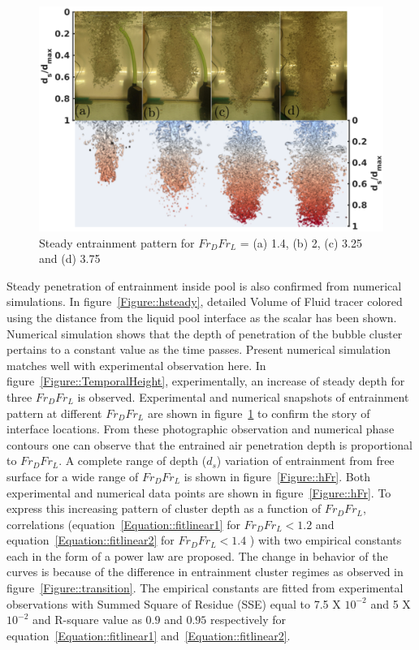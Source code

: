 \begin{figure}
	\centering
	\includegraphics[width=\linewidth]{chapters/jetPool/Figure14}
	\caption{Steady entrainment pattern for  $Fr_DFr_L$ = (a) 1.4, (b) 2, (c) 3.25 and (d) 3.75}
	\label{Figure::height_diff}		
\end{figure} 
Steady penetration of entrainment inside pool is also confirmed from numerical simulations. In figure~\ref{Figure::hsteady}, detailed Volume of Fluid tracer colored using the distance from the liquid pool interface as the scalar has been shown. Numerical simulation shows that the depth of penetration of the bubble cluster pertains to a constant value as the time passes. Present numerical simulation matches well with experimental observation here. In figure~\ref{Figure::TemporalHeight}, experimentally, an increase of steady depth for three $Fr_DFr_L$ is observed. Experimental and numerical snapshots of entrainment pattern at different $Fr_DFr_L$ are shown in figure~\ref{Figure::height_diff} to confirm the story of interface locations. From these photographic observation and numerical phase contours one can observe that the entrained air penetration depth is proportional to $Fr_DFr_L$. A complete range of depth ($d_s$) variation of entrainment from free surface for a wide range of $Fr_DFr_L$ is shown in  figure~\ref{Figure::hFr}. Both experimental and numerical data points are shown in figure~\ref{Figure::hFr}. To express this increasing pattern of cluster depth as a function of $Fr_DFr_L$, correlations (equation~\ref{Equation::fitlinear1} for $Fr_DFr_L < 1.2$ and equation~\ref{Equation::fitlinear2} for $Fr_DFr_L < 1.4$ ) with two empirical constants each in the form of a power law are proposed. The change in behavior of the curves is because of the difference in entrainment cluster regimes as observed in figure~\ref{Figure::transition}. The empirical constants are fitted from experimental observations with Summed Square of Residue (SSE) equal to 7.5 X $10^{-2}$ and 5 X $10^{-2}$ and R-square value as $0.9$ and $0.95$ respectively for equation~\ref{Equation::fitlinear1} and~\ref{Equation::fitlinear2}. 
